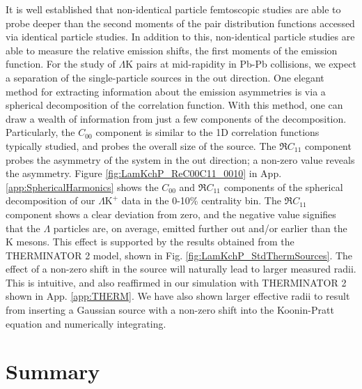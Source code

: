 \documentclass[ALICE,manyauthors]{cernphprep}
\newcommand{\Lam}{$\Lambda$\xspace}
\newcommand{\LamK}{$\Lambda$K\xspace}
\newcommand{\LamKchP}{$\Lambda\mathrm{K^{+}}$\xspace}
\begin{document}
It is well established that non-identical particle femtoscopic studies are able to probe deeper than the second moments of the pair distribution functions accessed via identical particle studies.
In addition to this, non-identical particle studies are able to measure the relative emission shifts, the first moments of the emission function.
For the study of \LamK pairs at mid-rapidity in Pb-Pb collisions, we expect a separation of the single-particle sources in the out direction.
One elegant method for extracting information about the emission asymmetries is via a spherical decomposition of the correlation function.
With this method, one can draw a wealth of information from just a few components of the decomposition.
Particularly, the $C_{00}$ component is similar to the 1D correlation functions typically studied, and probes the overall size of the source.
The $\Re C_{11}$ component probes the asymmetry of the system in the out direction; a non-zero value reveals the asymmetry. 
Figure \ref{fig:LamKchP_ReC00C11_0010} in App. \ref{app:SphericalHarmonics} shows the $C_{00}$ and $\Re C_{11}$ components of the spherical decomposition of our \LamKchP data in the 0-10\% centrality bin.
The $\Re C_{11}$ component shows a clear deviation from zero, and the negative value signifies that the \Lam particles are, on average, emitted further out and/or earlier than the K mesons.
This effect is supported by the results obtained from the THERMINATOR 2 model, shown in Fig. \ref{fig:LamKchP_StdThermSources}.
The effect of a non-zero shift in the source will naturally lead to larger measured radii.
This is intuitive, and also reaffirmed in our simulation with THERMINATOR 2 shown in App. \ref{app:THERM}.
We have also shown larger effective radii to result from inserting a Gaussian source with a non-zero shift into the Koonin-Pratt equation and numerically integrating.

\section{Summary}
\label{sec:Summary}
\end{document}
